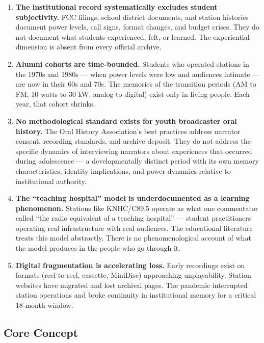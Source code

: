 \documentclass[11pt,letterpaper]{article}
\begin{document}
\begin{enumerate}
  \item \textbf{The institutional record systematically excludes student subjectivity.} FCC filings, school district documents, and station histories document power levels, call signs, format changes, and budget crises. They do not document what students experienced, felt, or learned. The experiential dimension is absent from every official archive.

  \item \textbf{Alumni cohorts are time-bounded.} Students who operated stations in the 1970s and 1980s --- when power levels were low and audiences intimate --- are now in their 60s and 70s. The memories of the transition periods (AM to FM, 10 watts to 30 kW, analog to digital) exist only in living people. Each year, that cohort shrinks.

  \item \textbf{No methodological standard exists for youth broadcaster oral history.} The Oral History Association's best practices address narrator consent, recording standards, and archive deposit. They do not address the specific dynamics of interviewing narrators about experiences that occurred during adolescence --- a developmentally distinct period with its own memory characteristics, identity implications, and power dynamics relative to institutional authority.

  \item \textbf{The ``teaching hospital'' model is underdocumented as a learning phenomenon.} Stations like KNHC/C89.5 operate as what one commentator called ``the radio equivalent of a teaching hospital'' --- student practitioners operating real infrastructure with real audiences. The educational literature treats this model abstractly. There is no phenomenological account of what the model produces in the people who go through it.

  \item \textbf{Digital fragmentation is accelerating loss.} Early recordings exist on formats (reel-to-reel, cassette, MiniDisc) approaching unplayability. Station websites have migrated and lost archival pages. The pandemic interrupted station operations and broke continuity in institutional memory for a critical 18-month window.
\end{enumerate}

\subsection{Core Concept}
\end{document}
